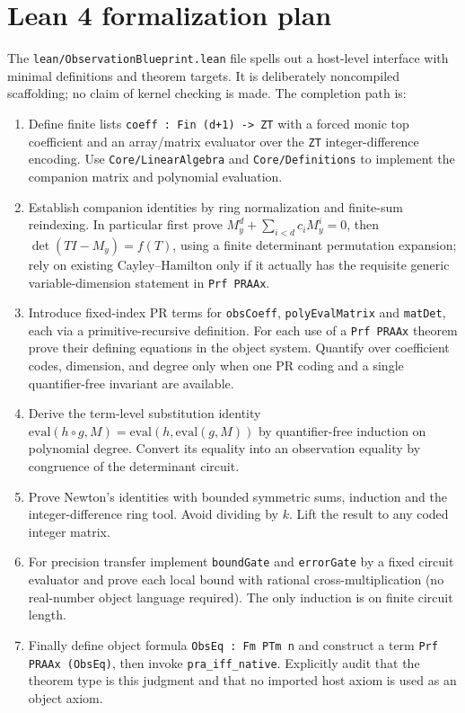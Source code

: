 \documentclass[11pt]{article}
\begin{document}
\section{Lean 4 formalization plan}\label{sec:lean}
The \texttt{lean/ObservationBlueprint.lean} file spells out a host-level interface with minimal definitions and theorem targets. It is deliberately noncompiled scaffolding; no claim of kernel checking is made. The completion path is:
\begin{enumerate}[leftmargin=*]
\item Define finite lists \texttt{coeff : Fin (d+1) -> ZT} with a forced monic top coefficient and an array/matrix evaluator over the \texttt{ZT} integer-difference encoding. Use \texttt{Core/LinearAlgebra} and \texttt{Core/Definitions} to implement the companion matrix and polynomial evaluation.
\item Establish companion identities by ring normalization and finite-sum reindexing. In particular first prove \(M_y^d+\sum_{i<d}c_iM_y^i=0\), then \(\det(TI-M_y)=f(T)\), using a finite determinant permutation expansion; rely on existing Cayley--Hamilton only if it actually has the requisite generic variable-dimension statement in \texttt{Prf PRAAx}.
\item Introduce fixed-index PR terms for \texttt{obsCoeff}, \texttt{polyEvalMatrix} and \texttt{matDet}, each via a primitive-recursive definition. For each use of a \texttt{Prf PRAAx} theorem prove their defining equations in the object system. Quantify over coefficient codes, dimension, and degree only when one PR coding and a single quantifier-free invariant are available.
\item Derive the term-level substitution identity \(\mathrm{eval}(h\circ g,M)=\mathrm{eval}(h,\mathrm{eval}(g,M))\) by quantifier-free induction on polynomial degree. Convert its equality into an observation equality by congruence of the determinant circuit.
\item Prove Newton's identities with bounded symmetric sums, induction and the integer-difference ring tool. Avoid dividing by \(k\). Lift the result to any coded integer matrix.
\item For precision transfer implement \texttt{boundGate} and \texttt{errorGate} by a fixed circuit evaluator and prove each local bound with rational cross-multiplication (no real-number object language required). The only induction is on finite circuit length.
\item Finally define object formula \texttt{ObsEq : Fm PTm n} and construct a term \texttt{Prf PRAAx (ObsEq)}, then invoke \texttt{pra\_iff\_native}. Explicitly audit that the theorem type is this judgment and that no imported host axiom is used as an object axiom.
\end{enumerate}
\end{document}
